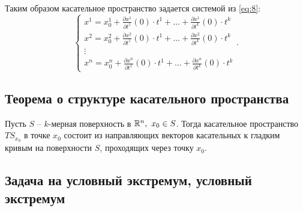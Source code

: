 \begin{definition}
    Таким образом касательное пространство задается системой из \ref{eq:8}:
    \[
        \left\{\begin{array}{l}
            x^1 = x^1_0 + \frac{\partial x^1}{\partial t^1} (0)\cdot t^1 + \ldots + \frac{\partial x^1}{\partial t^k}(0)\cdot t^k \\
            x^2 = x^2_0 + \frac{\partial x^2}{\partial t^1} (0)\cdot t^1 + \ldots + \frac{\partial x^2}{\partial t^k}(0)\cdot t^k \\
            \vdots                                                                                                        \\
            x^n = x^n_0 + \frac{\partial x^n}{\partial t^1} (0)\cdot t^1 + \ldots + \frac{\partial x^n}{\partial t^k}(0)\cdot t^k
        \end{array}\right..
    \]
\end{definition}

\subsection{Теорема о структуре касательного пространства}

\begin{theorem}\label{theorem:2}
    Пусть $S$ -- $k$-мерная поверхность в $\mathbb{R}^n, \ x_0 \in S$. Тогда касательное пространство $TS_{x_0}$ в точке $x_0$ состоит из направляющих векторов касательных к гладким кривым на поверхности $S$, проходящих через точку $x_0$.
\end{theorem}

\subsection{Задача на условный экстремум, условный экстремум}

